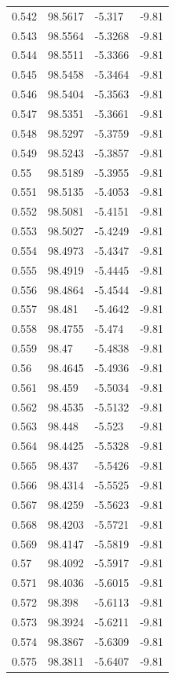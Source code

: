 \begin{tabular}{llll}
0.542 & 98.5617 & -5.317 & -9.81 \\
0.543 & 98.5564 & -5.3268 & -9.81 \\
0.544 & 98.5511 & -5.3366 & -9.81 \\
0.545 & 98.5458 & -5.3464 & -9.81 \\
0.546 & 98.5404 & -5.3563 & -9.81 \\
0.547 & 98.5351 & -5.3661 & -9.81 \\
0.548 & 98.5297 & -5.3759 & -9.81 \\
0.549 & 98.5243 & -5.3857 & -9.81 \\
0.55 & 98.5189 & -5.3955 & -9.81 \\
0.551 & 98.5135 & -5.4053 & -9.81 \\
0.552 & 98.5081 & -5.4151 & -9.81 \\
0.553 & 98.5027 & -5.4249 & -9.81 \\
0.554 & 98.4973 & -5.4347 & -9.81 \\
0.555 & 98.4919 & -5.4445 & -9.81 \\
0.556 & 98.4864 & -5.4544 & -9.81 \\
0.557 & 98.481 & -5.4642 & -9.81 \\
0.558 & 98.4755 & -5.474 & -9.81 \\
0.559 & 98.47 & -5.4838 & -9.81 \\
0.56 & 98.4645 & -5.4936 & -9.81 \\
0.561 & 98.459 & -5.5034 & -9.81 \\
0.562 & 98.4535 & -5.5132 & -9.81 \\
0.563 & 98.448 & -5.523 & -9.81 \\
0.564 & 98.4425 & -5.5328 & -9.81 \\
0.565 & 98.437 & -5.5426 & -9.81 \\
0.566 & 98.4314 & -5.5525 & -9.81 \\
0.567 & 98.4259 & -5.5623 & -9.81 \\
0.568 & 98.4203 & -5.5721 & -9.81 \\
0.569 & 98.4147 & -5.5819 & -9.81 \\
0.57 & 98.4092 & -5.5917 & -9.81 \\
0.571 & 98.4036 & -5.6015 & -9.81 \\
0.572 & 98.398 & -5.6113 & -9.81 \\
0.573 & 98.3924 & -5.6211 & -9.81 \\
0.574 & 98.3867 & -5.6309 & -9.81 \\
0.575 & 98.3811 & -5.6407 & -9.81 \\

\end{tabular}
